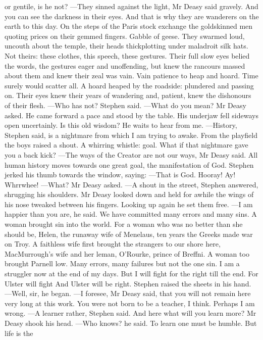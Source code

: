 \documentclass{article}
\begin{document}
or gentile, is he not?
—They sinned against the light, Mr Deasy said gravely. And you can see
the darkness in their eyes. And that is why they are wanderers on the
earth to this day.
On the steps of the Paris stock exchange the goldskinned men quoting
prices on their gemmed fingers. Gabble of geese. They swarmed loud,
uncouth about the temple, their heads thickplotting under maladroit silk
hats. Not theirs: these clothes, this speech, these gestures. Their full
slow eyes belied the words, the gestures eager and unoffending, but
knew the rancours massed about them and knew their zeal was vain. Vain
patience to heap and hoard. Time surely would scatter all. A hoard
heaped by the roadside: plundered and passing on. Their eyes knew their
years of wandering and, patient, knew the dishonours of their flesh.
—Who has not? Stephen said.
—What do you mean? Mr Deasy asked.
He came forward a pace and stood by the table. His underjaw fell
sideways open uncertainly. Is this old wisdom? He waits to hear from me.
—History, Stephen said, is a nightmare from which I am trying to
awake.
From the playfield the boys raised a shout. A whirring whistle: goal.
What if that nightmare gave you a back kick?
—The ways of the Creator are not our ways, Mr Deasy said. All human
history moves towards one great goal, the manifestation of God.
Stephen jerked his thumb towards the window, saying:
—That is God.
Hooray! Ay! Whrrwhee!
—What? Mr Deasy asked.
—A shout in the street, Stephen answered, shrugging his shoulders.
Mr Deasy looked down and held for awhile the wings of his nose tweaked
between his fingers. Looking up again he set them free.
—I am happier than you are, he said. We have committed many errors and
many sins. A woman brought sin into the world. For a woman who was no
better than she should be, Helen, the runaway wife of Menelaus, ten
years the Greeks made war on Troy. A faithless wife first brought
the strangers to our shore here, MacMurrough’s wife and her leman,
O’Rourke, prince of Breffni. A woman too brought Parnell low. Many
errors, many failures but not the one sin. I am a struggler now at the
end of my days. But I will fight for the right till the end.
     For Ulster will fight
     And Ulster will be right.
Stephen raised the sheets in his hand.
—Well, sir, he began.
—I foresee, Mr Deasy said, that you will not remain here very long
at this work. You were not born to be a teacher, I think. Perhaps I am
wrong.
—A learner rather, Stephen said.
And here what will you learn more?
Mr Deasy shook his head.
—Who knows? he said. To learn one must be humble. But life is the
\end{document}
